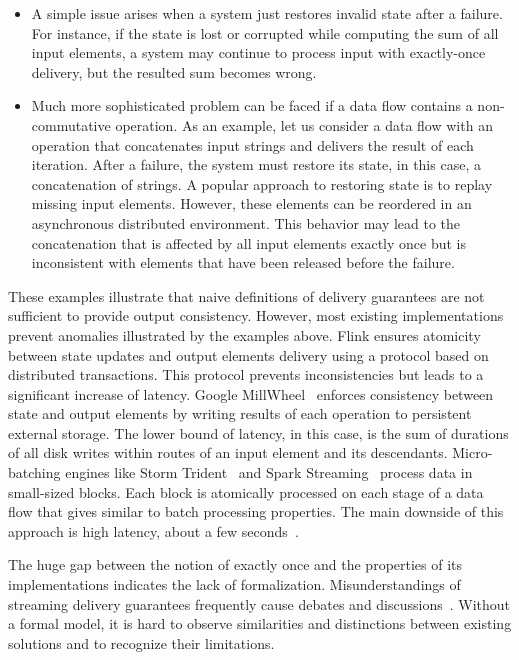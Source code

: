 \begin{itemize}
    \item A simple issue arises when a system just restores invalid state after a failure. For instance, if the state is lost or corrupted while computing the sum of all input elements, a system may continue to process input with exactly-once delivery, but the resulted sum becomes wrong. 
    \item Much more sophisticated problem can be faced if a data flow contains a non-commutative operation. As an example, let us consider a data flow with an operation that concatenates input strings and delivers the result of each iteration. After a failure, the system must restore its state, in this case, a concatenation of strings. A popular approach to restoring state is to replay missing input elements. However, these elements can be reordered in an asynchronous distributed environment. This behavior may lead to the concatenation that is affected by all input elements exactly once but is inconsistent with elements that have been released before the failure.    
\end{itemize}

These examples illustrate that naive definitions of delivery guarantees are not sufficient to provide output consistency. However, most existing implementations prevent anomalies illustrated by the examples above. Flink ensures atomicity between state updates and output elements delivery using a protocol based on distributed transactions. This protocol prevents inconsistencies but leads to a significant increase of latency. Google MillWheel~\cite{Akidau:2013:MFS:2536222.2536229} enforces consistency between state and output elements by writing results of each operation to persistent external storage. The lower bound of latency, in this case, is the sum of durations of all disk writes within routes of an input element and its descendants. Micro-batching engines like Storm Trident~\cite{apache:storm:trident} and Spark Streaming~\cite{Zaharia:2012:DSE:2342763.2342773} process data in small-sized blocks. Each block is atomically processed on each stage of a data flow that gives similar to batch processing properties. The main downside of this approach is high latency, about a few seconds~\cite{7530084, 7474816}.

The huge gap between the notion of exactly once and the properties of its implementations indicates the lack of formalization. Misunderstandings of streaming delivery guarantees frequently cause debates and discussions~\cite{JerryPengStreamIO, PaperTrail}. Without a formal model, it is hard to observe similarities and distinctions between existing solutions and to recognize their limitations.

